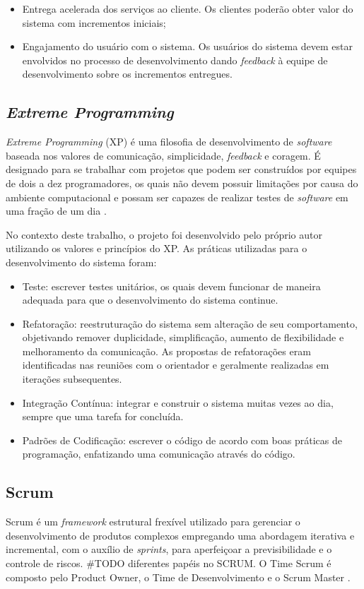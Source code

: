 \begin{itemize}
    \item Entrega acelerada dos serviços ao cliente. Os clientes poderão obter valor do sistema com incrementos iniciais;
    \item Engajamento do usuário com o sistema. Os usuários do sistema devem estar envolvidos no processo
    de desenvolvimento dando \textit{feedback} à equipe de desenvolvimento sobre os incrementos entregues.
\end{itemize}

    \subsection{\textit{Extreme Programming}}
    \textit{Extreme Programming} (XP) é uma filosofia de desenvolvimento de \textit{software} baseada nos valores de comunicação, simplicidade, \textit{feedback} e coragem. É designado para se trabalhar com projetos que podem ser
    construídos por equipes de dois a dez programadores, os quais não devem possuir limitações
    por causa do ambiente computacional e possam ser capazes de realizar testes de
    \textit{software} em uma fração de um dia \cite{beck_2004}.

    No contexto deste trabalho, o projeto foi desenvolvido pelo próprio autor utilizando os valores e princípios do XP. As práticas utilizadas para o desenvolvimento do sistema foram:

    \begin{itemize}
        \item Teste: escrever testes unitários, os quais devem funcionar de maneira adequada para que
        o desenvolvimento do sistema continue.
        \item Refatoração: reestruturação do sistema sem alteração de seu comportamento, objetivando
        remover duplicidade, simplificação, aumento de flexibilidade e melhoramento da comunicação. As propostas de refatorações eram identificadas nas reuniões com o orientador
        e geralmente realizadas em iterações subsequentes.
        \item Integração Contínua: integrar e construir o sistema muitas vezes ao dia, sempre que uma tarefa
        for concluída.
        \item Padrões de Codificação: escrever o código de acordo com boas práticas de programação, enfatizando uma comunicação através do código.
    \end{itemize}

    \subsection{Scrum}
    Scrum é um \textit{framework} estrutural frexível utilizado
    para gerenciar o desenvolvimento de produtos complexos empregando uma abordagem iterativa
    e incremental, com o auxílio de \textit{sprints}, para aperfeiçoar a previsibilidade e o controle de riscos. \#TODO diferentes papéis no SCRUM. O Time Scrum é composto pelo Product Owner, o Time de Desenvolvimento e o Scrum Master \cite{scrum_guide}.

